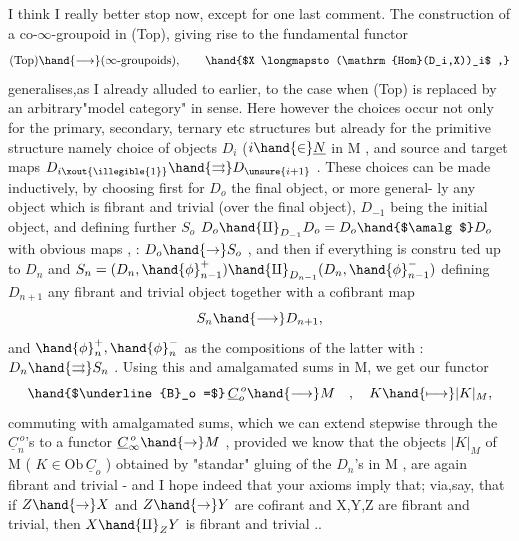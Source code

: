 

 I think I really better stop now, except for one last comment. The
construction of a co-$\infty$-groupoid  in (Top), giving rise to the fundamental
functor
\[ \text{(Top)} \hand{\longrightarrow} (\infty\text{-groupoids}), \qquad \hand{$X \longmapsto (\mathrm{Hom}(D_i,X))_i$ ,} \]
generalises,as I already alluded to earlier, to the case when (Top) is
replaced by an arbitrary"model category"  in   sense. Here however the
choices occur not only  for the primary, secondary, ternary etc structures\hand{,}
but already for the primitive structure\hand{,} namely  choice of objects $D_i$ ($i\hand{\in}\underline{N}$
in M , and source and target maps $D_{i\xout{\illegible{1}}} \hand{\rightrightarrows} D_{\unsure{i+1}}$ . These choices can be made
inductively, by choosing first for $D_o$ the final object, or more general-%
ly any object which is fibrant and trivial (over the final object), $D_{-1}$
being the initial object, and defining further $S_o$  $D_o\hand{\amalg}_{D_{-1}} D_o = D_o \hand{$\amalg$} D_o$
with obvious maps  ,  : $D_o \hand{\to} S_o$ , and then \hand{,}if everything is constru\hand{-}
ted up to $D_n$ \deleted{\unsure{,}} and $S_n = (D_n,\hand{\phi}_{n-1}^+)\hand{\amalg}_{D_{n-1}}(D_n,\hand{\phi}_{n-1}^-)$\hand{,} defining $D_{n+1}$  any
fibrant and trivial object together with a cofibrant map
\[ S_n \hand{\longrightarrow} D_{n+1} , \]
and $\hand{\phi}_n^+ , \hand{\phi}_n^-$ as the compositions of the latter with  : $D_n \hand{\rightrightarrows} S_n$ .
Using this and amalgamated sums in M, we get our functor
\[ \hand{$\underline{B}_o =$}\, \underline{C}_o^{\,o} \hand{\longrightarrow} M \quad , \quad K \hand{\longmapsto} |K|_M , \]
commuting with amalgamated sums, which we can extend stepwise through
the $\underline{C}_n^{\,o}$'s to a functor  $\underline{C}_\infty^{\,o} \hand{\to} M$ , provided we know that the objects
$|K|_M$ of M ( $K \in \mathrm{Ob}\,\underline{C}_o$ ) obtained  by "standar" gluing of the
$D_n$'s in M , are again fibrant and trivial - and I hope indeed that
your axioms imply that; via,say, that if $Z\hand{\to} X$ and $Z \hand{\to} Y$ are cofirant
and X,Y,Z are fibrant and trivial, then $X\hand{\amalg}_Z Y$ is fibrant and trivial ..

